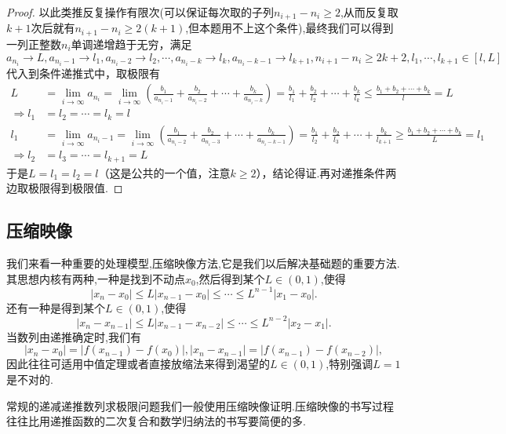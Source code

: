 \documentclass[../../main.tex]{subfiles}%
\begin{document}
\begin{proof}
以此类推反复操作有限次(可以保证每次取的子列$n_{i+1}-n_i\geqslant  2$,从而反复取$k+1$次后就有$n_{i+1}-n_i\geqslant  2(k+1)$,但本题用不上这个条件),最终我们可以得到一列正整数\(n_i\)单调递增趋于无穷，满足
\[a_{n_i}\to L,a_{n_i - 1}\to l_1,a_{n_i - 2}\to l_2,\cdots,a_{n_i - k}\to l_k,a_{n_i - k - 1}\to l_{k + 1},n_{i + 1}-n_i\geqslant 2k + 2,l_1,\cdots,l_{k + 1}\in[l,L]\]
代入到条件递推式中，取极限有
\begin{align*}
L&=\lim_{i\rightarrow\infty}a_{n_i}=\lim_{i\rightarrow\infty}\left(\frac{b_1}{a_{n_i - 1}}+\frac{b_2}{a_{n_i - 2}}+\cdots+\frac{b_k}{a_{n_i - k}}\right)=\frac{b_1}{l_1}+\frac{b_2}{l_2}+\cdots+\frac{b_k}{l_k}\leqslant \frac{b_1 + b_2+\cdots + b_k}{l}=L\\
\Rightarrow l_1&=l_2=\cdots=l_k = l\\
l_1&=\lim_{i\rightarrow\infty}a_{n_i - 1}=\lim_{i\rightarrow\infty}\left(\frac{b_1}{a_{n_i - 2}}+\frac{b_2}{a_{n_i - 3}}+\cdots+\frac{b_k}{a_{n_i - k - 1}}\right)=\frac{b_1}{l_2}+\frac{b_2}{l_3}+\cdots+\frac{b_k}{l_{k + 1}}\geqslant \frac{b_1 + b_2+\cdots + b_k}{L}=l_1\\
\Rightarrow l_2&=l_3=\cdots=l_{k + 1}=L
\end{align*}
于是\(L = l_1 = l_2=l\)（这是公共的一个值，注意\(k\geqslant 2\)），结论得证.再对递推条件两边取极限得到极限值.

\end{proof}



\subsection{压缩映像}
我们来看一种重要的处理模型,压缩映像方法,它是我们以后解决基础题的重要方法.其思想内核有两种,一种是找到不动点\(x_0\),然后得到某个\(L\in(0,1)\),使得
\[
|x_n - x_0|\leqslant  L|x_{n - 1} - x_0|\leqslant \cdots\leqslant  L^{n - 1}|x_1 - x_0|.
\]
还有一种是得到某个\(L\in(0,1)\),使得
\[
|x_n - x_{n - 1}|\leqslant  L|x_{n - 1} - x_{n - 2}|\leqslant \cdots\leqslant  L^{n - 2}|x_2 - x_1|.
\]
当数列由递推确定时,我们有
\[
|x_n - x_0| = |f(x_{n - 1}) - f(x_0)|,|x_n - x_{n - 1}| = |f(x_{n - 1}) - f(x_{n - 2})|,
\]
因此往往可适用中值定理或者直接放缩法来得到渴望的\(L\in(0,1)\),特别强调\(L = 1\)是不对的.

\begin{note}
常规的递减递推数列求极限问题我们一般使用压缩映像证明.压缩映像的书写过程往往比用递推函数的二次复合和数学归纳法的书写要简便的多.
\end{note}
\end{document}
